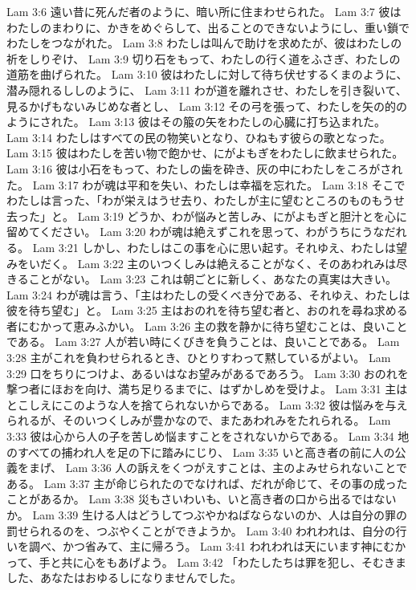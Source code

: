 Lam 3:6  遠い昔に死んだ者のように、暗い所に住まわせられた。
Lam 3:7  彼はわたしのまわりに、かきをめぐらして、出ることのできないようにし、重い鎖でわたしをつながれた。
Lam 3:8  わたしは叫んで助けを求めたが、彼はわたしの祈をしりぞけ、
Lam 3:9  切り石をもって、わたしの行く道をふさぎ、わたしの道筋を曲げられた。
Lam 3:10  彼はわたしに対して待ち伏せするくまのように、潜み隠れるししのように、
Lam 3:11  わが道を離れさせ、わたしを引き裂いて、見るかげもないみじめな者とし、
Lam 3:12  その弓を張って、わたしを矢の的のようにされた。
Lam 3:13  彼はその箙の矢をわたしの心臓に打ち込まれた。
Lam 3:14  わたしはすべての民の物笑いとなり、ひねもす彼らの歌となった。
Lam 3:15  彼はわたしを苦い物で飽かせ、にがよもぎをわたしに飲ませられた。
Lam 3:16  彼は小石をもって、わたしの歯を砕き、灰の中にわたしをころがされた。
Lam 3:17  わが魂は平和を失い、わたしは幸福を忘れた。
Lam 3:18  そこでわたしは言った、「わが栄えはうせ去り、わたしが主に望むところのものもうせ去った」と。
Lam 3:19  どうか、わが悩みと苦しみ、にがよもぎと胆汁とを心に留めてください。
Lam 3:20  わが魂は絶えずこれを思って、わがうちにうなだれる。
Lam 3:21  しかし、わたしはこの事を心に思い起す。それゆえ、わたしは望みをいだく。
Lam 3:22  主のいつくしみは絶えることがなく、そのあわれみは尽きることがない。
Lam 3:23  これは朝ごとに新しく、あなたの真実は大きい。
Lam 3:24  わが魂は言う、「主はわたしの受くべき分である、それゆえ、わたしは彼を待ち望む」と。
Lam 3:25  主はおのれを待ち望む者と、おのれを尋ね求める者にむかって恵みふかい。
Lam 3:26  主の救を静かに待ち望むことは、良いことである。
Lam 3:27  人が若い時にくびきを負うことは、良いことである。
Lam 3:28  主がこれを負わせられるとき、ひとりすわって黙しているがよい。
Lam 3:29  口をちりにつけよ、あるいはなお望みがあるであろう。
Lam 3:30  おのれを撃つ者にほおを向け、満ち足りるまでに、はずかしめを受けよ。
Lam 3:31  主はとこしえにこのような人を捨てられないからである。
Lam 3:32  彼は悩みを与えられるが、そのいつくしみが豊かなので、またあわれみをたれられる。
Lam 3:33  彼は心から人の子を苦しめ悩ますことをされないからである。
Lam 3:34  地のすべての捕われ人を足の下に踏みにじり、
Lam 3:35  いと高き者の前に人の公義をまげ、
Lam 3:36  人の訴えをくつがえすことは、主のよみせられないことである。
Lam 3:37  主が命じられたのでなければ、だれが命じて、その事の成ったことがあるか。
Lam 3:38  災もさいわいも、いと高き者の口から出るではないか。
Lam 3:39  生ける人はどうしてつぶやかねばならないのか、人は自分の罪の罰せられるのを、つぶやくことができようか。
Lam 3:40  われわれは、自分の行いを調べ、かつ省みて、主に帰ろう。
Lam 3:41  われわれは天にいます神にむかって、手と共に心をもあげよう。
Lam 3:42  「わたしたちは罪を犯し、そむきました、あなたはおゆるしになりませんでした。
